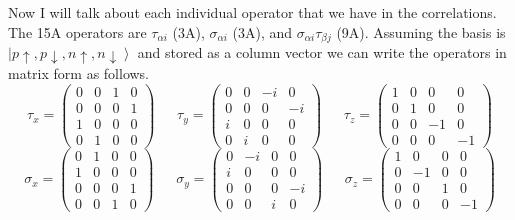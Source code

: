 Now I will talk about each individual operator that we have in the correlations. The 15A operators are $\tau_{\alpha i}$ (3A), $\sigma_{\alpha i}$ (3A), and $\sigma_{\alpha i}\tau_{\beta j}$ (9A). Assuming the basis is $\left|p\uparrow,p\downarrow,n\uparrow,n\downarrow\right>$ and stored as a column vector we can write the operators in matrix form as follows.
\begin{equation*}
\tau_x=
\begin{pmatrix}
    0 & 0 & 1 & 0 \\
    0 & 0 & 0 & 1 \\
    1 & 0 & 0 & 0 \\
    0 & 1 & 0 & 0
\end{pmatrix}
~~~~~~~\tau_y=
\begin{pmatrix}
    0 & 0 & -i & 0 \\
    0 & 0 & 0 & -i \\
    i & 0 & 0 & 0 \\
    0 & i & 0 & 0
\end{pmatrix}
~~~~~~~\tau_z=
\begin{pmatrix}
    1 & 0 & 0 & 0 \\
    0 & 1 & 0 & 0 \\
    0 & 0 & -1 & 0 \\
    0 & 0 & 0 & -1
\end{pmatrix}
\end{equation*}
\begin{equation*}
\sigma_x=
\begin{pmatrix}
    0 & 1 & 0 & 0 \\
    1 & 0 & 0 & 0 \\
    0 & 0 & 0 & 1 \\
    0 & 0 & 1 & 0
\end{pmatrix}
~~~~~~~\sigma_y=
\begin{pmatrix}
    0 & -i & 0 & 0 \\
    i & 0 & 0 & 0 \\
    0 & 0 & 0 & -i \\
    0 & 0 & i & 0
\end{pmatrix}
~~~~~~~\sigma_z=
\begin{pmatrix}
    1 & 0 & 0 & 0 \\
    0 & -1 & 0 & 0 \\
    0 & 0 & 1 & 0 \\
    0 & 0 & 0 & -1
\end{pmatrix}
\end{equation*}
